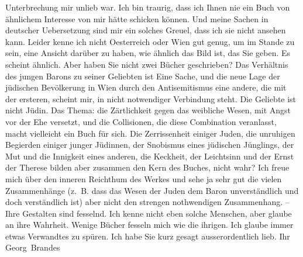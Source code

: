 \begin{ledgroupsized}[t]{13cm}
               Unterbrechung mir unlieb war.\pend
           \pstart
           {\pb}Ich bin traurig, dass ich Ihnen
               nie ein Buch von ähnlichem Interesse von mir hätte schicken können. Und meine Sachen
               in deutscher Uebersetzung sind mir ein solches Greuel, dass ich sie nicht ansehen
               kann.\pend
           \pstart
           Leider kenne ich nicht Oesterreich oder Wien gut genug, um im Stande zu sein, eine Ansicht
               darüber zu haben, wie ähnlich das Bild ist, das Sie geben. Es scheint ähnlich. Aber
               haben Sie nicht zwei Bücher geschrieben? Das Verhältnis des jungen Barons zu seiner Geliebten ist Eine Sache,
               und die {\pb}neue Lage der jüdischen
               Bevölkerung in Wien durch den Antisemitismus eine
               andere, die mit der ersteren, scheint mir, in nicht notwendiger Verbindung steht. Die
               Geliebte ist nicht Jüdin.\pend
           \pstart
           Das Thema: die Zärtlichkeit gegen das weibliche Wesen, mit Angst vor der Ehe
               versetzt, und die Collisionen, die diese Combination veranlasst,  macht vielleicht ein Buch für sich. Die
               Zerrissenheit einiger Juden, die unruhigen Begierden einiger junger Jüdinnen, der
               Snobismus eines jüdischen Jünglings, der {\pb}Mut und die Innigkeit eines
               anderen, die Keckheit, der Leichtsinn und der Ernst der Therese bilden aber zusammen den Kern des
               Buches, nicht wahr? Ich freue mich über den inneren Reichthum des Werkes und sehe ja
               sehr gut die vielen Zusammenhänge (z. B. dass das Wesen der Juden dem Baron
               unverständlich und doch verständlich ist) aber nicht den strengen nothwendigen
               Zusammenhang. – Ihre Gestalten sind fesselnd. Ich kenne nicht eben solche Menschen,
               aber glaube an ihre Wahrheit.\pend
           \pstart
           Wenige Bücher fesseln mich wie die ihrigen. Ich glaube immer etwas Verwandtes zu
               spüren.\pend
           \pstart
           Ich habe Sie kurz gesagt ausserordentlich lieb.\pend
           \pstart Ihr \spacefill\mbox{Georg Brandes}\pend{}
         
         \endnumbering{}\end{ledgroupsized}  \newcommand{\dateiname}{L01777}\newcommand{\titel}{Georg Brandes an Arthur Schnitzler, [25. 6. 1908]}\newcommand{\editorInnen}{Martin Anton Müller und Gerd-Hermann Susen}
      